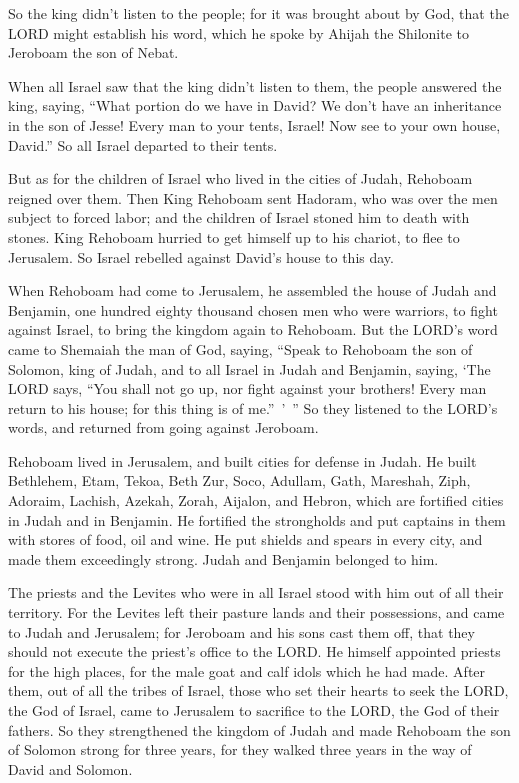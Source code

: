 \myverse{}So the king didn’t listen to the people; for it was brought
about by God, that the LORD might establish his word, which he spoke by Ahijah the Shilonite to Jeroboam
the son of Nebat.

\myverse{}When all Israel saw that the king didn’t listen to them, the
people answered the king, saying, “What portion do we have in David? We don’t have an inheritance in the
son of Jesse! Every man to your tents, Israel! Now see to your own house, David.” So all Israel departed
to their tents.

\myverse{}But as for the children of Israel who lived in the cities of
Judah, Rehoboam reigned over them.
\myverse{}Then King Rehoboam sent Hadoram, who was over the men subject to forced labor;
and the children of Israel stoned him to death with stones. King Rehoboam hurried to get himself up to
his chariot, to flee to Jerusalem.
\myverse{}So Israel rebelled against David’s house to this day.


\mychapter{} \myverse*{}When Rehoboam had come to Jerusalem, he assembled the house of
Judah and Benjamin, one hundred eighty thousand chosen men who were warriors, to fight against Israel,
to bring the kingdom again to Rehoboam.
\myverse{}But the LORD’s word came to Shemaiah the man of God, saying,
\myverse{}“Speak to Rehoboam the son of Solomon, king of Judah, and to all Israel in
Judah and Benjamin, saying,
\myverse{}‘The LORD says, “You shall not go up, nor fight against your brothers! Every
man return to his house; for this thing is of me.” ’ ” So they listened to the LORD’s words, and returned
from going against Jeroboam.

\myverse{}Rehoboam lived in Jerusalem, and built cities for defense in Judah.
\myverse{}He built Bethlehem, Etam, Tekoa,
\myverse{}Beth Zur, Soco, Adullam,
\myverse{}Gath, Mareshah, Ziph,
\myverse{}Adoraim, Lachish, Azekah,
\myverse{}Zorah, Aijalon, and Hebron, which are fortified cities in Judah and in Benjamin.
\myverse{}He fortified the strongholds and put captains in them with stores of food,
oil and wine.
\myverse{}He put shields and spears in every city, and made them exceedingly strong.
Judah and Benjamin belonged to him.

\myverse{}The priests and the Levites who were in all Israel stood with
him out of all their territory.
\myverse{}For the Levites left their pasture lands and their possessions, and came
to Judah and Jerusalem; for Jeroboam and his sons cast them off, that they should not execute the priest’s
office to the LORD.
\myverse{}He himself appointed priests for the high places, for the male goat and calf
idols which he had made.
\myverse{}After them, out of all the tribes of Israel, those who set their hearts to
seek the LORD, the God of Israel, came to Jerusalem to sacrifice to the LORD, the God of their fathers.
\myverse{}So they strengthened the kingdom of Judah and made Rehoboam the son of Solomon
strong for three years, for they walked three years in the way of David and Solomon.


